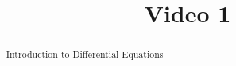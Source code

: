 \documentclass[handout]{ximera}
\title{Video 1}
\begin{document}
\begin{abstract}
Introduction to Differential Equations
\end{abstract}

\maketitle

\end{document}
